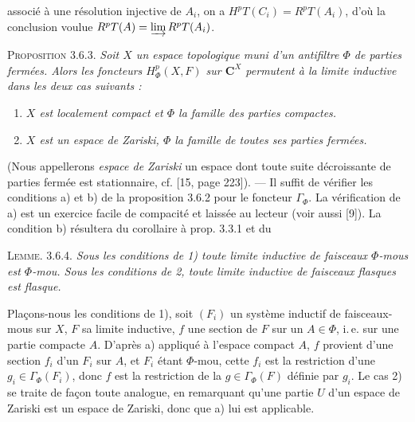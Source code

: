 
\noindent associé à une résolution injective de $A_i$, on a
$H^pT(C_i)=R^pT(A_i)$, d'où la conclusion voulue
$R^pT(A)=\varinjlim R^pT(A_i)$.

\indent\textsc{Proposition 3.6.3.} \textit{Soit $X$ un espace
topologique muni d'un antifiltre $\Phi$ de parties fermées. Alors les foncteurs
$H^p_\Phi(X,F)$ sur $\mathbf C^X$ permutent à la limite inductive dans les deux cas
suivants :}
\begin{enumerate}
\item \textit{$X$ est localement compact et $\Phi$ la famille des parties
compactes.}
\item \textit{$X$ est un espace de Zariski, $\Phi$ la famille de toutes ses
parties fermées.}
\end{enumerate}

(Nous appellerons \textit{espace de Zariski} un espace dont toute suite
décroissante de parties fermée est stationnaire, cf. [15, page 223]). ---
Il suffit de vérifier les conditions a) et b) de la proposition 3.6.2 pour le
foncteur $\Gamma_\Phi$. La vérification de a) est un exercice facile de
compacité et laissée au lecteur (voir aussi [9]). La condition b) résultera du
corollaire à prop. 3.3.1 et du

\indent\textsc{Lemme. 3.6.4.} \textit{Sous les conditions de \textup{1)} toute
limite inductive de faisceaux $\Phi$-mous est $\Phi$-mou. Sous les conditions
de \textup{2}, toute limite inductive de faisceaux flasques est flasque.}

Plaçons-nous les conditions de 1), soit $(F_i)$ un système inductif de
faisceaux-mous sur $X$, $F$ sa limite inductive, $f$ une section de $F$
sur un $A\in\Phi$, i.\,e. sur une partie compacte $A$. D'après a) appliqué à
l'espace compact $A$, $f$ provient d'une section $f_i$ d'un $F_i$ sur $A$, et
$F_i$ étant $\Phi$-mou, cette $f_i$ est la restriction d'une
$g_i\in\Gamma_\Phi(F_i)$, donc $f$ est la restriction de la
$g\in\Gamma_\Phi(F)$ définie par $g_i$. Le cas 2) se traite de façon toute
analogue, en remarquant qu'une partie $U$ d'un espace de Zariski est un espace
de Zariski, donc que a) lui est applicable.

